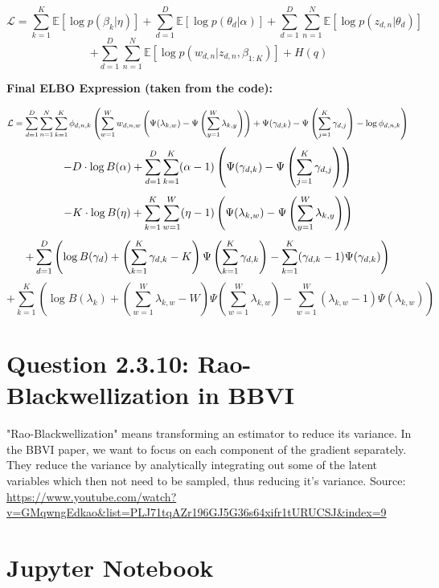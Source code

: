 \documentclass{article}
\begin{document}
\[
\mathcal{L} = \sum_{k=1}^{K} \mathbb{E}[\log p(\beta_k | \eta)] + \sum_{d=1}^{D} \mathbb{E}[\log p(\theta_d | \alpha)] + \sum_{d=1}^{D} \sum_{n=1}^{N} \mathbb{E}[\log p(z_{d,n} | \theta_d)]
\]
\[
+ \sum_{d=1}^{D} \sum_{n=1}^{N} \mathbb{E}[\log p(w_{d,n} | z_{d,n}, \beta_{1:K})] + H(q)
\]

\textbf{Final ELBO Expression (taken from the code):}

\[
\mathcal{L} = \sum_{d=1}^{D} \sum_{n=1}^{N} \sum_{k=1}^{K} \phi_{d,n,k} \left( \sum_{w=1}^{W} w_{d,n,w} \left( \Psi(\lambda_{k,w}) - \Psi\left(\sum_{y=1}^{W} \lambda_{k,y}\right) \right) + \Psi(\gamma_{d,k}) - \Psi\left(\sum_{j=1}^{K} \gamma_{d,j}\right) - \log \phi_{d,n,k} \right) \\
\]
\[
- D \cdot \log B(\alpha) + \sum_{d=1}^{D} \sum_{k=1}^{K} (\alpha - 1) \left( \Psi(\gamma_{d,k}) - \Psi\left(\sum_{j=1}^{K} \gamma_{d,j}\right) \right) \\
\]
\[
- K \cdot \log B(\eta) + \sum_{k=1}^{K} \sum_{w=1}^{W} (\eta - 1) \left( \Psi(\lambda_{k,w}) - \Psi\left(\sum_{y=1}^{W} \lambda_{k,y}\right) \right) \\
\]
\[
+ \sum_{d=1}^{D} \left( \log B(\gamma_d) + \left(\sum_{k=1}^{K} \gamma_{d,k} - K\right) \Psi\left(\sum_{k=1}^{K} \gamma_{d,k}\right) - \sum_{k=1}^{K} (\gamma_{d,k} - 1) \Psi(\gamma_{d,k}) \right) \\
\]
\[
+ \sum_{k=1}^{K} \left( \log B(\lambda_k) + \left(\sum_{w=1}^{W} \lambda_{k,w} - W\right) \Psi\left(\sum_{w=1}^{W} \lambda_{k,w}\right) - \sum_{w=1}^{W} (\lambda_{k,w} - 1) \Psi(\lambda_{k,w}) \right)
\]

\section*{Question 2.3.10: Rao-Blackwellization in BBVI}

"Rao-Blackwellization" means transforming an estimator to reduce its variance.
In the BBVI paper, we want to focus on each component of the gradient separately. They reduce the variance by analytically integrating out some of the latent variables which then not need to be sampled, thus reducing it's variance.
Source: \url{https://www.youtube.com/watch?v=GMqwngEdkao&list=PLJ71tqAZr196GJ5G36s64xifr1tURUCSJ&index=9}

\appendix
\section{Jupyter Notebook}

\end{document}

